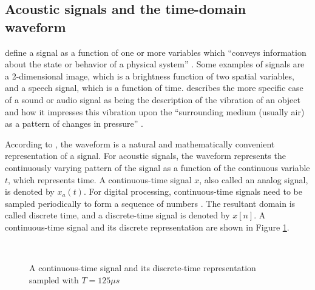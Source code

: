 \documentclass[report.tex]{subfiles}
\begin{document}
\subsection{Acoustic signals and the time-domain waveform}
\label{sec:timedomain}

\citeauthor{discretebook} define a signal as a function of one or more variables which ``conveys information about the state or behavior of a physical system'' \parencite[8]{discretebook}. Some examples of signals are a 2-dimensional image, which is a brightness function of two spatial variables, and a speech signal, which is a function of time. \citeauthor{moore} describes the more specific case of a sound or audio signal as being the description of the vibration of an object and how it impresses this vibration upon the ``surrounding medium (usually air) as a pattern of changes in pressure'' \parencite[2]{moore}.

According to \textcite{melbook}, the waveform is a natural and mathematically convenient representation of a signal. For acoustic signals, the waveform represents the continuously varying pattern of the signal as a function of the continuous variable $t$, which represents time. A continuous-time signal $x$, also called an analog signal, is denoted by $x_{a}(t)$. For digital processing, continuous-time signals need to be sampled periodically to form a sequence of numbers \parencite{discretebook}. The resultant domain is called discrete time, and a discrete-time signal is denoted by $x[n]$. A continuous-time signal and its discrete representation are shown in Figure \ref{fig:discretecontinuous}.

\begin{figure}[ht]
	\centering
	\\
	\caption{A continuous-time signal and its discrete-time representation sampled with $T = 125\mu s$ \parencite[10]{discretebook}}
	\label{fig:discretecontinuous}
\end{figure}
\end{document}
